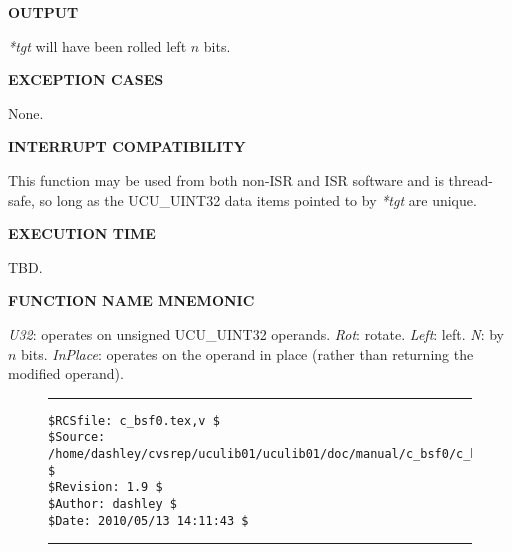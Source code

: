 \noindent\textbf{OUTPUT}
\begin{list}{}{\setlength{\leftmargin}{0.25in}\setlength{\topsep}{0.0in}}
\item  \emph{*tgt} will have been rolled left $n$ bits.
\end{list}
\vspace{2.8ex}

\noindent\textbf{EXCEPTION CASES}
\begin{list}{}{\setlength{\leftmargin}{0.25in}\setlength{\topsep}{0.0in}}
\item None.
\end{list}
\vspace{2.8ex}

\noindent\textbf{INTERRUPT COMPATIBILITY}
\begin{list}{}{\setlength{\leftmargin}{0.25in}\setlength{\topsep}{0.0in}}
\item This function may be used from both non-ISR and ISR software and
      is thread-safe,
      so long as the UCU\_UINT32 data items pointed
      to by \emph{*tgt} are unique.
\end{list}
\vspace{2.8ex}

\noindent\textbf{EXECUTION TIME}
\begin{list}{}{\setlength{\leftmargin}{0.25in}\setlength{\topsep}{0.0in}}
\item TBD.
\end{list}
\vspace{2.8ex}

\noindent\textbf{FUNCTION NAME MNEMONIC}
\begin{list}{}{\setlength{\leftmargin}{0.25in}\setlength{\topsep}{0.0in}}
\item \emph{U32}:     operates on unsigned UCU\_UINT32 operands.
      \emph{Rot}:     rotate.
      \emph{Left}:    left.
      \emph{N}:       by $n$ bits.
      \emph{InPlace}: operates on the operand in place (rather than returning the
                      modified operand).
\end{list}


\noindent\begin{figure}[!b]
\noindent\rule[-0.25in]{\textwidth}{1pt}
\begin{tiny}
\begin{verbatim}
$RCSfile: c_bsf0.tex,v $
$Source: /home/dashley/cvsrep/uculib01/uculib01/doc/manual/c_bsf0/c_bsf0.tex,v $
$Revision: 1.9 $
$Author: dashley $
$Date: 2010/05/13 14:11:43 $
\end{verbatim}
\end{tiny}
\noindent\rule[0.25in]{\textwidth}{1pt}
\end{figure}

